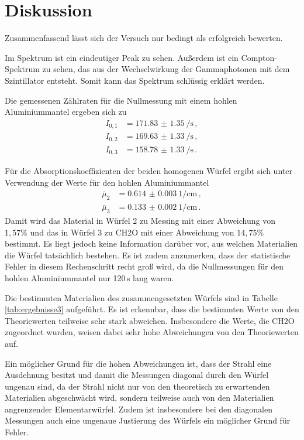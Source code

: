 \section{Diskussion}
\label{sec:Diskussion}

Zusammenfassend lässt sich der Versuch nur bedingt als erfolgreich bewerten.

Im Spektrum ist ein eindeutiger Peak zu sehen. Außerdem ist ein Compton-Spektrum
zu sehen, das aus der Wechselwirkung der Gammaphotonen mit dem Szintillator entsteht.
Somit kann das Spektrum schlüssig erklärt werden.

Die gemessenen Zählraten für die Nullmessung mit einem hohlen Aluminiummantel
ergeben sich zu
\begin{align*}
  I_{0,1}&=\SI{171.83(135)}{\per\second} \,, \\
  I_{0,2}&=\SI{169.63(133)}{\per\second} \,, \\
  I_{0,3}&=\SI{158.78(133)}{\per\second} \,.
\end{align*}

Für die Absorptionskoeffizienten der beiden homogenen Würfel ergibt sich unter Verwendung der
Werte für den hohlen Aluminiummantel
\begin{align*}
  \bar{\mu}_2&= \SI{0.614(3)}{1\per \centi\metre}\,, \\
  \bar{\mu}_3&=\SI{0.133(2)}{1\per \centi\metre} \,.
\end{align*}
Damit wird das Material in Würfel 2 zu Messing mit einer Abweichung von $1{,}57\%$
und das in Würfel 3 zu CH2O mit einer Abweichung von $14{,}75\%$ bestimmt. Es liegt
jedoch keine Information darüber vor, aus welchen Materialien die Würfel tatsächlich bestehen.
Es ist zudem anzumerken, dass der statistische Fehler in diesem Rechenschritt recht groß
wird, da die Nullmessungen für den hohlen Aluminiummantel nur 120\,s lang waren.

Die bestimmten Materialien des zusammengesetzten Würfels sind in Tabelle \ref{tab:ergebnisse3}
aufgeführt. Es ist erkennbar, dass die bestimmten Werte von den Theoriewerten teilweise sehr stark abweichen.
Insbesondere die Werte, die CH2O zugeordnet wurden, weisen dabei sehr hohe Abweichungen von den Theoriewerten auf.

Ein möglicher Grund für die hohen Abweichungen ist, dass der
Strahl eine Ausdehnung besitzt und damit die Messungen diagonal durch den Würfel ungenau sind, da der Strahl nicht nur von den theoretisch zu erwartenden Materialien abgeschwächt wird, sondern teilweise auch von den Materialien angrenzender Elementarwürfel. Zudem ist insbesondere bei den diagonalen Messungen auch eine ungenaue Justierung des Würfels ein möglicher Grund für Fehler.
